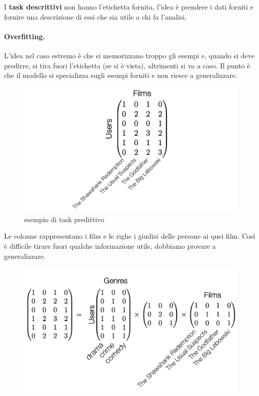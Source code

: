 I \textbf{task descrittivi} non hanno l'etichetta fornita, l'idea è prendere i dati forniti e fornire una descrizione di essi che sia utile a chi fa l'analisi.

\paragraph{Overfitting.} L'idea nel caso estremo è che si memorizzano troppo gli esempi e, quando si deve predirre, si tira fuori l'etichetta (se si è vista), altrimenti si va a caso. Il punto è che il modello si specializza sugli esempi forniti e non riesce a generalizzare.

\newpage
\begin{figure}
    \centering
    \includegraphics[scale=0.6]{images/predTask.png}
    \caption{esempio di task predittivo}
    \label{fig:enter-label}
\end{figure}

Le colonne rappresentano i film e le righe i giudizi delle persone ai quei film. Così è difficile tirare fuori qualche informazione utile, dobbiamo provare a generalizzare.

\begin{figure}[!h]
    \centering
    \includegraphics[scale=0.6]{images/predTask1.png}
    \caption{}
    \label{fig:enter-label}
\end{figure}

